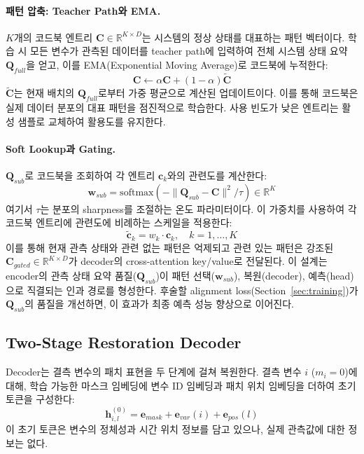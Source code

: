 \paragraph{패턴 압축: Teacher Path와 EMA.}
$K$개의 코드북 엔트리 $\mathbf{C} \in \mathbb{R}^{K \times D}$는 시스템의 정상 상태를 대표하는 패턴 벡터이다. 학습 시 모든 변수가 관측된 데이터를 teacher path에 입력하여 전체 시스템 상태 요약 $\mathbf{Q}_{full}$을 얻고, 이를 EMA(Exponential Moving Average)로 코드북에 누적한다:
%
\begin{equation}
  \mathbf{C} \leftarrow \alpha \mathbf{C} + (1 - \alpha) \tilde{\mathbf{C}}
\end{equation}
%
$\tilde{\mathbf{C}}$는 현재 배치의 $\mathbf{Q}_{full}$로부터 가중 평균으로 계산된 업데이트이다. 이를 통해 코드북은 실제 데이터 분포의 대표 패턴을 점진적으로 학습한다. 사용 빈도가 낮은 엔트리는 활성 샘플로 교체하여 활용도를 유지한다.

\paragraph{Soft Lookup과 Gating.}
$\mathbf{Q}_{sub}$로 코드북을 조회하여 각 엔트리 $\mathbf{c}_k$와의 관련도를 계산한다:
%
\begin{equation}
  \mathbf{w}_{sub} = \mathrm{softmax}\!\left(-\|\mathbf{Q}_{sub} - \mathbf{C}\|^2 / \tau\right) \in \mathbb{R}^K
\end{equation}
%
여기서 $\tau$는 분포의 sharpness를 조절하는 온도 파라미터이다. 이 가중치를 사용하여 각 코드북 엔트리에 관련도에 비례하는 스케일을 적용한다:
%
\begin{equation}
  \tilde{\mathbf{c}}_k = w_k \cdot \mathbf{c}_k, \quad k = 1, \ldots, K
\end{equation}
%
이를 통해 현재 관측 상태와 관련 없는 패턴은 억제되고 관련 있는 패턴은 강조된 $\mathbf{C}_{gated} \in \mathbb{R}^{K \times D}$가 decoder의 cross-attention key/value로 전달된다. 이 설계는 encoder의 관측 상태 요약 품질($\mathbf{Q}_{sub}$)이 패턴 선택($\mathbf{w}_{sub}$), 복원(decoder), 예측(head)으로 직결되는 인과 경로를 형성한다. 후술할 alignment loss(Section~\ref{sec:training})가 $\mathbf{Q}_{sub}$의 품질을 개선하면, 이 효과가 최종 예측 성능 향상으로 이어진다.


\subsection{Two-Stage Restoration Decoder}

Decoder는 결측 변수의 패치 표현을 두 단계에 걸쳐 복원한다. 결측 변수 $i$ ($m_i = 0$)에 대해, 학습 가능한 마스크 임베딩에 변수 ID 임베딩과 패치 위치 임베딩을 더하여 초기 토큰을 구성한다:
%
\begin{equation}
  \mathbf{h}^{(0)}_{i,l} = \mathbf{e}_{mask} + \mathbf{e}_{var}(i) + \mathbf{e}_{pos}(l)
\end{equation}
%
이 초기 토큰은 변수의 정체성과 시간 위치 정보를 담고 있으나, 실제 관측값에 대한 정보는 없다.

